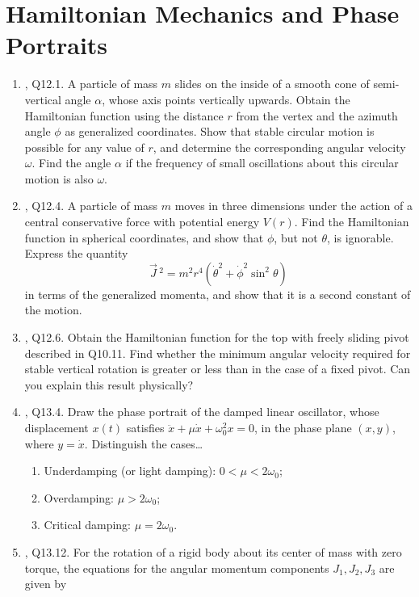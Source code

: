 \documentclass[../psets.tex]{subfiles}
\begin{document}
\section{Hamiltonian Mechanics and Phase Portraits}
\begin{enumerate}
    \item {}\textcite{bib:KibbleBerkshire}, Q12.1. A particle of mass $m$ slides on the inside of a smooth cone of semi-vertical angle $\alpha$, whose axis points vertically upwards. Obtain the Hamiltonian function using the distance $r$ from the vertex and the azimuth angle $\phi$ as generalized coordinates. Show that stable circular motion is possible for any value of $r$, and determine the corresponding angular velocity $\omega$. Find the angle $\alpha$ if the frequency of small oscillations about this circular motion is also $\omega$.
    \item \textcite{bib:KibbleBerkshire}, Q12.4. A particle of mass $m$ moves in three dimensions under the action of a central conservative force with potential energy $V(r)$. Find the Hamiltonian function in spherical coordinates, and show that $\phi$, but not $\theta$, is ignorable. Express the quantity
    \begin{equation*}
        \vec{J}{\,}^2 = m^2r^4(\dot{\theta}^2+\dot{\phi}^2\sin^2\theta)
    \end{equation*}
    in terms of the generalized momenta, and show that it is a second constant of the motion.
    \item \textcite{bib:KibbleBerkshire}, Q12.6. Obtain the Hamiltonian function for the top with freely sliding pivot described in Q10.11. Find whether the minimum angular velocity required for stable vertical rotation is greater or less than in the case of a ﬁxed pivot. Can you explain this result physically?
    \item \textcite{bib:KibbleBerkshire}, Q13.4. Draw the phase portrait of the damped linear oscillator, whose displacement $x(t)$ satisﬁes $\ddot{x}+\mu\dot{x}+\omega_0^2x=0$, in the phase plane $(x,y)$, where $y=\dot{x}$. Distinguish the cases\dots
    \begin{enumerate}
        \item Underdamping (or light damping): $0<\mu<2\omega_0$;
        \item Overdamping: $\mu>2\omega_0$;
        \item Critical damping: $\mu=2\omega_0$.
    \end{enumerate}
    \item \textcite{bib:KibbleBerkshire}, Q13.12. For the rotation of a rigid body about its center of mass with zero torque, the equations for the angular momentum components $J_1,J_2,J_3$ are given by

\end{enumerate}
\end{document}
